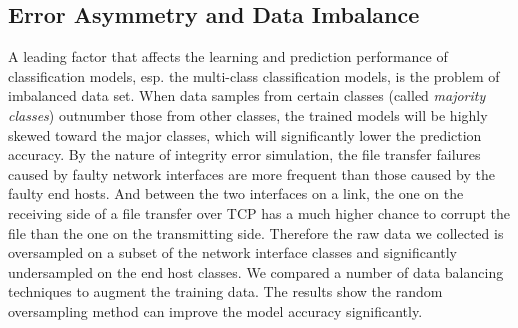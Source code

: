 \subsection{Error Asymmetry and Data Imbalance} 
\label{sub:ml:imbalance}
A leading factor that affects the learning and prediction performance of classification models, esp. the multi-class classification models, is the problem of imbalanced data set. When data samples from certain classes (called {\it majority classes}) outnumber those from other classes, the trained models will be highly skewed toward the major classes, which will significantly lower the prediction accuracy. By the nature of integrity error simulation, the file transfer failures caused by faulty network interfaces are more frequent than those caused by the faulty end hosts. And between the two interfaces on a link, the one on the receiving side of a file transfer over TCP has a much higher chance to corrupt the file than the one on the transmitting side. Therefore the raw data we collected is oversampled on a subset of the network interface classes and significantly undersampled on the end host classes. We compared a number of data balancing techniques to augment the training data. The results show the random oversampling method can improve the model accuracy significantly.